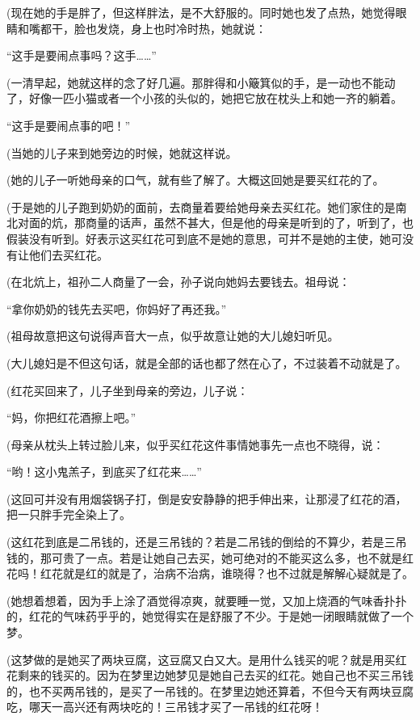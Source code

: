 \par (现在她的手是胖了，但这样胖法，是不大舒服的。同时她也发了点热，她觉得眼睛和嘴都干，脸也发烧，身上也时冷时热，她就说：
\par “这手是要闹点事吗？这手……”
\par (一清早起，她就这样的念了好几遍。那胖得和小簸箕似的手，是一动也不能动了，好像一匹小猫或者一个小孩的头似的，她把它放在枕头上和她一齐的躺着。
\par “这手是要闹点事的吧！”
\par (当她的儿子来到她旁边的时候，她就这样说。
\par (她的儿子一听她母亲的口气，就有些了解了。大概这回她是要买红花的了。
\par (于是她的儿子跑到奶奶的面前，去商量着要给她母亲去买红花。她们家住的是南北对面的炕，那商量的话声，虽然不甚大，但是他的母亲是听到的了，听到了，也假装没有听到。好表示这买红花可到底不是她的意思，可并不是她的主使，她可没有让他们去买红花。
\par (在北炕上，祖孙二人商量了一会，孙子说向她妈去要钱去。祖母说：
\par “拿你奶奶的钱先去买吧，你妈好了再还我。”
\par (祖母故意把这句说得声音大一点，似乎故意让她的大儿媳妇听见。
\par (大儿媳妇是不但这句话，就是全部的话也都了然在心了，不过装着不动就是了。
\par (红花买回来了，儿子坐到母亲的旁边，儿子说：
\par “妈，你把红花酒擦上吧。”
\par (母亲从枕头上转过脸儿来，似乎买红花这件事情她事先一点也不晓得，说：
\par “哟！这小鬼羔子，到底买了红花来……”
\par (这回可并没有用烟袋锅子打，倒是安安静静的把手伸出来，让那浸了红花的酒，把一只胖手完全染上了。
\par (这红花到底是二吊钱的，还是三吊钱的？若是二吊钱的倒给的不算少，若是三吊钱的，那可贵了一点。若是让她自己去买，她可绝对的不能买这么多，也不就是红花吗！红花就是红的就是了，治病不治病，谁晓得？也不过就是解解心疑就是了。
\par (她想着想着，因为手上涂了酒觉得凉爽，就要睡一觉，又加上烧酒的气味香扑扑的，红花的气味药乎乎的，她觉得实在是舒服了不少。于是她一闭眼睛就做了一个梦。
\par (这梦做的是她买了两块豆腐，这豆腐又白又大。是用什么钱买的呢？就是用买红花剩来的钱买的。因为在梦里边她梦见是她自己去买的红花。她自己也不买三吊钱的，也不买两吊钱的，是买了一吊钱的。在梦里边她还算着，不但今天有两块豆腐吃，哪天一高兴还有两块吃的！三吊钱才买了一吊钱的红花呀！
